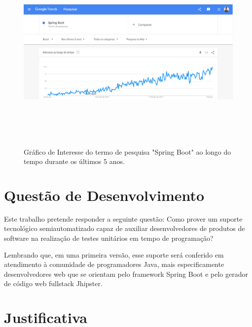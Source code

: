 \begin{figure}[h]
\centering 
\includegraphics[width=17cm,height=10cm]{figuras/print_screen_trends.PNG}
\caption{Gráfico de Interesse do termo de pesquisa "Spring Boot" ao longo do tempo durante os últimos 5 anos.}
\label{grafico_spring}
\end{figure}

\newpage

\section[Questão de Desenvolvimento]{Questão de Desenvolvimento}
\label{questao_de_pesquisa}

Este trabalho pretende responder a seguinte questão: Como prover um suporte tecnológico semiautomatizado capaz de auxiliar desenvolvedores de produtos de software na realização de testes unitários em tempo de programação?

Lembrando que, em uma primeira versão, esse suporte será conferido em atendimento à comunidade de programadores Java, mais especificamente desenvolvedores web que se orientam pelo framework Spring Boot e pelo gerador de código web fullstack Jhipster.

\section[Justificativa]{Justificativa}
\label{justificativa}

